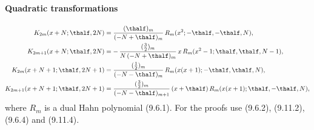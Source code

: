 \documentclass[envcountchap,graybox]{svmono}
\begin{document}
\paragraph{Quadratic transformations}
\begin{align}
K_{2m}(x+N;\thalf,2N)&=\frac{(\thalf)_m}{(-N+\thalf)_m}\,
R_m(x^2;-\thalf,-\thalf,N),
\label{31}\\
K_{2m+1}(x+N;\thalf,2N)&=-\,\frac{(\tfrac32)_m}{N\,(-N+\thalf)_m}\,
x\,R_m(x^2-1;\thalf,\thalf,N-1),
\label{33}\\
K_{2m}(x+N+1;\thalf,2N+1)&=\frac{(\tfrac12)_m}{(-N-\thalf)_m}\,
R_m(x(x+1);-\thalf,\thalf,N),
\label{32}\\
K_{2m+1}(x+N+1;\thalf,2N+1)&=\frac{(\tfrac32)_m}{(-N-\thalf)_{m+1}}\,
(x+\thalf)\,R_m(x(x+1);\thalf,-\thalf,N),
\label{34}
\end{align}
where $R_m$ is a dual Hahn polynomial (9.6.1). For the proofs use
(9.6.2), (9.11.2), (9.6.4) and (9.11.4).
%
\end{document}
